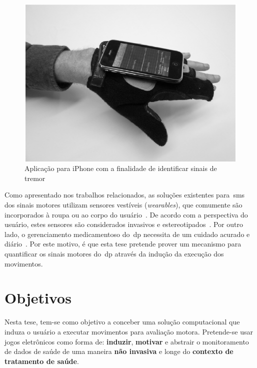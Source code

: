 \begin{figure}
\centering
  \includegraphics[scale=0.3]{./img/moyne-iphone.png}
\caption[Aplicação para \textit{smartphone} com a finalidade de identificar sinais de tremor]{Aplicação para iPhone com a finalidade de identificar sinais de tremor ~\cite{lemoyne2010}}
 \label{fig:iphone-tremor}
\end{figure}


Como apresentado nos trabalhos relacionados, as soluções existentes para~\ac{sms} dos sinais motores utilizam sensores vestíveis (\textit{wearables}), que comumente são incorporados à roupa ou ao corpo do usuário~\cite{classifiersparkinson2014}. De acordo com a perspectiva do usuário, estes sensores são considerados invasivos e estereotipados~\cite{aarhus_negotiating_2010}. Por outro lado, o gerenciamento medicamentoso do~\ac{dp} necessita de um cuidado acurado e diário~\cite{parkself2015,quantitativeparkinson2011}. Por este motivo, é que esta tese pretende prover um mecanismo para quantificar os sinais motores do~\ac{dp} através da indução da execução dos movimentos.


\section{Objetivos}\label{section:objetivos}
Nesta tese, tem-se como objetivo a conceber uma solução computacional que induza o usuário a executar movimentos para avaliação motora. Pretende-se usar jogos eletrônicos como forma de: \textbf{induzir}, \textbf{motivar} e abstrair o monitoramento de dados de saúde de uma maneira \textbf{não invasiva} e longe do \textbf{contexto de tratamento de saúde}.

